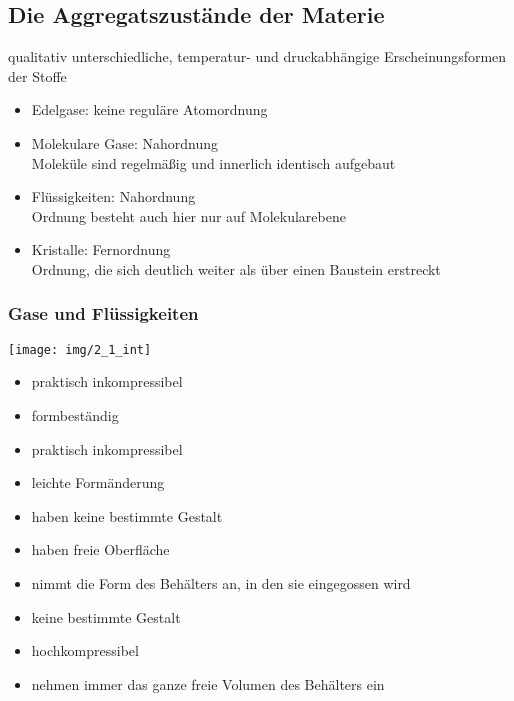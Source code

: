 \subsection{Die Aggregatszustände der Materie}

 qualitativ unterschiedliche, temperatur- und druckabhängige Erscheinungsformen der Stoffe

\begin{itemize}
	\item Edelgase: keine reguläre Atomordnung
	\item Molekulare Gase: Nahordnung\\
		Moleküle sind regelmäßig und innerlich identisch aufgebaut
	\item Flüssigkeiten: Nahordnung\\
		Ordnung besteht auch hier nur auf Molekularebene
	\item Kristalle: Fernordnung\\
		Ordnung, die sich deutlich weiter als über einen Baustein erstreckt
\end{itemize}

\subsubsection{Gase und Flüssigkeiten}

\begin{center}
	\texttt{[image: img/2\_1\_int]}
\end{center}

\begin{itemize}
	\item praktisch inkompressibel
	\item formbeständig
\end{itemize}

\begin{itemize}
	\item praktisch inkompressibel
	\item leichte Formänderung
	\item haben keine bestimmte Gestalt
	\item haben freie Oberfläche
	\item nimmt die Form des Behälters an, in den sie eingegossen wird
\end{itemize}

\begin{itemize}
	\item keine bestimmte Gestalt
	\item hochkompressibel
	\item nehmen immer das ganze freie Volumen des Behälters ein
\end{itemize}

